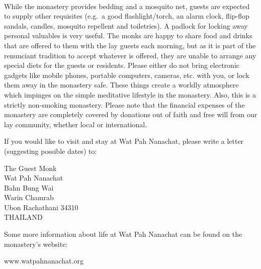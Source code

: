 \\While the monastery provides bedding and a mosquito net, guests are
expected to supply other requisites (e.g.~a good flashlight/torch, an
alarm clock, flip-flop sandals, candles, mosquito repellent and
toiletries). A padlock for locking away personal valuables is very
useful. The monks are happy to share food and drinks that are offered to
them with the lay guests each morning, but as it is part of the
renunciant tradition to accept whatever is offered, they are unable to
arrange any special diets for the guests or residents. Please either do
not bring electronic gadgets like mobile phones, portable computers,
cameras, etc. with you, or lock them away in the monastery safe. These
things create a worldly atmosphere which impinges on the simple
meditative lifestyle in the monastery. Also, this is a strictly
non-smoking monastery. Please note that the financial expenses of the
monastery are completely covered by donations out of faith and free will
from our lay community, whether local or international.

If you would like to visit and stay at Wat Pah Nanachat, please write a
letter (suggesting possible dates) to:

The Guest Monk\\Wat Pah Nanachat\\Bahn Bung Wai\\Warin Chamrab\\Ubon
Rachathani 34310\\THAILAND

Some more information about life at Wat Pah Nanachat can be found on the
monastery's website:

www.watpahnanachat.org
